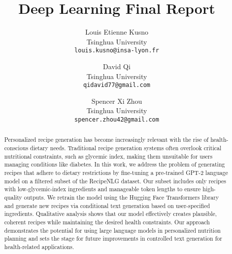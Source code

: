 \title{Deep Learning Final Report}

\author{Louis Etienne Kusno\\
Tsinghua University\\
{\tt\small louis.kusno@insa-lyon.fr}
\and
David Qi\\
Tsinghua University\\
{\tt\small qidavid77@gmail.com}
\and
Spencer Xi Zhou\\
Tsinghua University\\
{\tt\small spencer.zhou42@gmail.com}
}

\maketitle


\begin{abstract}
Personalized recipe generation has become increasingly relevant with the rise of health-conscious dietary needs. Traditional recipe generation systems often overlook critical nutritional constraints, such as glycemic index, making them unsuitable for users managing conditions like diabetes. In this work, we address the problem of generating recipes that adhere to dietary restrictions by fine-tuning a pre-trained GPT-2 language model on a filtered subset of the RecipeNLG dataset. Our subset includes only recipes with low-glycemic-index ingredients and manageable token lengths to ensure high-quality outputs. We retrain the model using the Hugging Face Transformers library and generate new recipes via conditional text generation based on user-specified ingredients. Qualitative analysis shows that our model effectively creates plausible, coherent recipes while maintaining the desired health constraints. Our approach demonstrates the potential for using large language models in personalized nutrition planning and sets the stage for future improvements in controlled text generation for health-related applications.
\end{abstract}